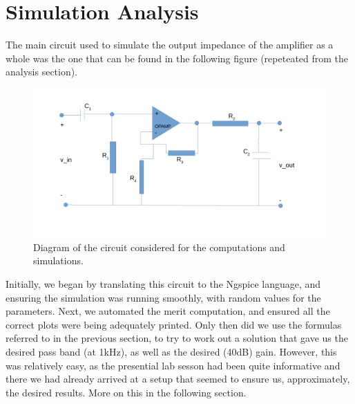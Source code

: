 \section{Simulation Analysis}
\label{sec:simulation}

The main circuit used to simulate the output impedance of the amplifier as a whole was the one that can be found in the following figure (repeteated from the analysis section).

\begin{figure}[h] \centering
\includegraphics[width=0.95\linewidth]{diagram_t5.pdf}
\caption{Diagram of the circuit considered for the computations and simulations.}
\label{fig:diagram_t5_2}
\end{figure}


Initially, we began by translating this circuit to the Ngspice language, and ensuring the simulation was running smoothly, with random values for the parameters. Next, we automated the merit computation, and ensured all the correct plots were being adequately printed. Only then did we use the formulas referred to in the previous section, to try to work out a solution that gave us the desired pass band (at 1kHz), as well as the desired (40dB) gain. However, this was relatively easy, as the presential lab sesson had been quite informative and there we had already arrived at a setup that seemed to ensure us, approximately, the desired results. More on this in the following section.

